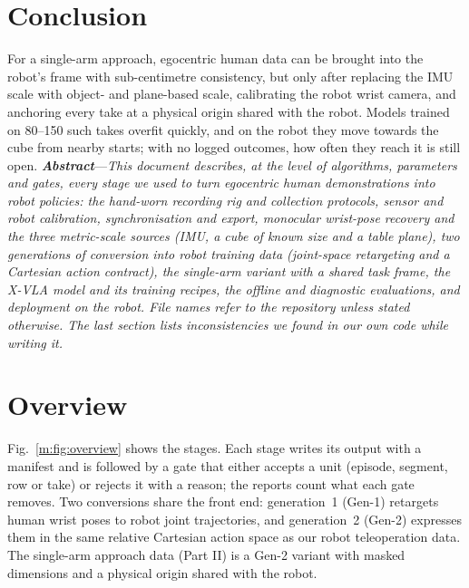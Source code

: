 \documentclass[conference,10pt]{IEEEtran}
\newcounter{rpart}
\newcommand{\reportpart}[3]{\clearpage\stepcounter{rpart}\setcounter{section}{0}%
  \twocolumn[{\centering{\LARGE\bfseries #1\par}\vspace{1.5mm}{\large #2\par}\vspace{3mm}\hrule\vspace{5mm}}]\label{#3}}
\newcommand{\partabstract}[1]{\noindent\textbf{\textit{Abstract}}---\textit{#1}\par\medskip}
\begin{document}
\section{Conclusion}
For a single-arm approach, egocentric human data can be brought into the robot's frame with sub-centimetre consistency, but
only after replacing the IMU scale with object- and plane-based scale, calibrating the robot wrist camera, and anchoring every
take at a physical origin shared with the robot. Models trained on 80--150 such takes overfit quickly, and on the robot they move
towards the cube from nearby starts; with no logged outcomes, how often they reach it is still open.
\reportpart{Methods and Pipeline}{How each stage works (companion to Parts I and II)}{part:m}
\partabstract{This document describes, at the level of algorithms, parameters and gates, every stage we used to turn egocentric human
demonstrations into robot policies: the hand-worn recording rig and collection protocols, sensor and robot calibration,
synchronisation and export, monocular wrist-pose recovery and the three metric-scale sources (IMU, a cube of known size and a
table plane), two generations of conversion into robot training data (joint-space retargeting and a Cartesian action contract),
the single-arm variant with a shared task frame, the X-VLA model and its training recipes, the offline and diagnostic
evaluations, and deployment on the robot. File names refer to the repository unless stated otherwise. The last section lists
inconsistencies we found in our own code while writing it.}
\section{Overview}
Fig.~\ref{m:fig:overview} shows the stages. Each stage writes its output with a manifest and is followed by a gate that either
accepts a unit (episode, segment, row or take) or rejects it with a reason; the reports count what each gate removes. Two
conversions share the front end: generation~1 (Gen-1) retargets human wrist poses to robot joint trajectories, and generation~2
(Gen-2) expresses them in the same relative Cartesian action space as our robot teleoperation data. The single-arm approach data
(Part II) is a Gen-2 variant with masked dimensions and a physical origin shared with the robot.
\end{document}
